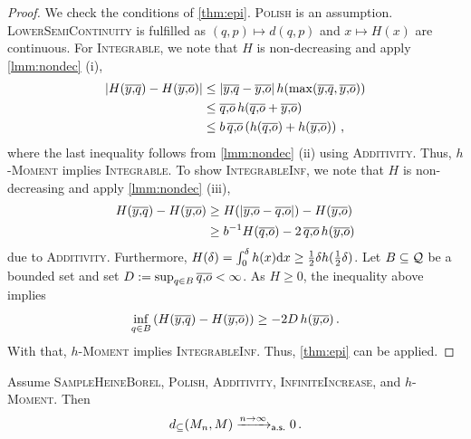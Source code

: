 \begin{proof}
	We check the conditions of \autoref{thm:epi}. \textsc{Polish} is an assumption. 
	\textsc{LowerSemiContinuity} is fulfilled as $(q,p)\mapsto d(q,p)$ and $x \mapsto H(x)$ are continuous.
	For \textsc{Integrable}, we note that $H$ is non-decreasing and apply \autoref{lmm:nondec} (i),
	\begin{align*}
		\abs{H(\ol yq) - H(\ol yo)} 
		&\leq 
		\abs{\ol yq - \ol yo} h\brOf{\max(\ol yq, \ol yo)}
		\\&\leq 
		\ol qo\, h(\ol qo + \ol yo)
		\\&\leq 
		b\, \ol qo \br{h(\ol qo) + h(\ol yo)}
		\eqcm
	\end{align*}
	where the last inequality follows from \autoref{lmm:nondec} (ii) using \textsc{Additivity}.
	Thus, \textsc{$h$-Moment} implies \textsc{Integrable}.
	To show \textsc{IntegrableInf}, we note that $H$ is non-decreasing and apply \autoref{lmm:nondec} (iii),
	\begin{align*}
		H(\ol yq) - H(\ol yo)
		&\geq 
		H(\abs{\ol yo - \ol qo}) - H(\ol yo)
		\\&\geq 
		b^{-1} H( \ol qo) - 2  \,\ol qo\, h( \ol yo)
	\end{align*}
	due to \textsc{Additivity}. Furthermore, $H(\delta)  = \int_0^\delta h(x) \mathrm{d} x \geq \frac12 \delta h(\frac12 \delta)$.
	Let $B \subseteq \mathcal{Q}$ be a bounded set and set $D := \sup_{q\in B} \overline{q,\!o} < \infty$. As $H \geq 0$, the inequality above implies
	\begin{equation*}
		\inf_{q \in B} \left( H(\overline{y,\!q}) - H(\overline{y,\!o}) \right) \geq - 2 D\, h(\overline{y,\!o})
		\, .
	\end{equation*}
	With that, \textsc{$h$-Moment} implies \textsc{IntegrableInf}.
	Thus, \autoref{thm:epi} can be applied.
\end{proof}
%
\begin{corollary}\label{cor:nondec:onehaus}
	Assume \textsc{SampleHeineBorel}, \textsc{Polish}, \textsc{Additivity}, \textsc{InfiniteIncrease}, and \textsc{$h$-Moment}.
	Then
	\begin{equation*}
		d_\subseteq(M_n, M) \xrightarrow{n\to\infty}_{\mathsf{a.s.}} 0
		\, .
	\end{equation*}
\end{corollary}
%
